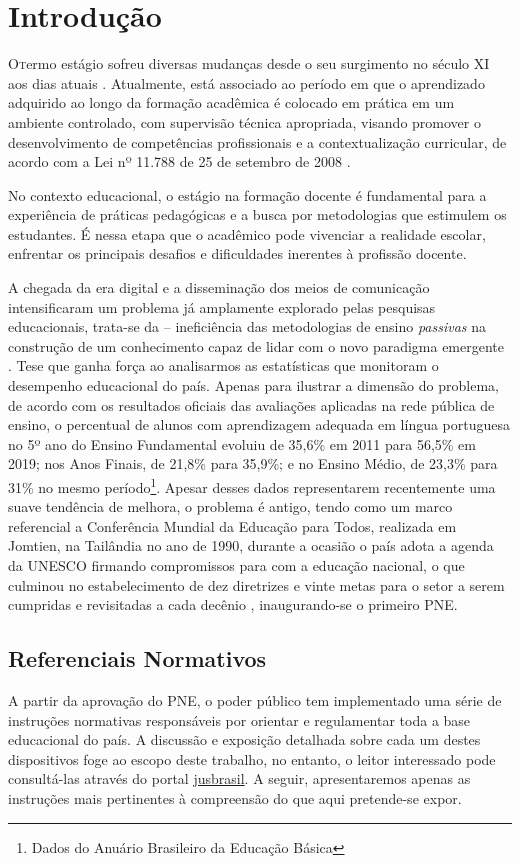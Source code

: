 \chapter{Introdução} %
\thispagestyle{empty}
\label{chap:Introdução}

\lettrine{O} termo estágio sofreu diversas mudanças desde o seu surgimento no século XI aos dias atuais \cite{COLOMBO:2014}. Atualmente, está associado ao período em que o aprendizado adquirido ao longo da formação acadêmica é colocado em prática em um ambiente controlado, com supervisão técnica apropriada, visando promover o desenvolvimento de competências profissionais e a contextualização curricular, de acordo com a Lei nº 11.788 de 25 de setembro de 2008 \cite{BRASIL:2008}.

No contexto educacional, o estágio na formação docente é fundamental para a experiência de práticas pedagógicas e a busca por metodologias que estimulem os estudantes. É nessa etapa que o acadêmico pode vivenciar a realidade escolar, enfrentar os principais desafios e dificuldades inerentes à profissão docente.

A chegada da era digital e a disseminação dos meios de comunicação intensificaram um problema já amplamente explorado pelas pesquisas educacionais, trata-se da -- ineficiência das metodologias de ensino \textit{passivas} na construção de um conhecimento capaz de lidar com o novo paradigma emergente \cite{MORAES:2018,DIESEL:2017}. Tese que ganha força ao analisarmos as estatísticas que monitoram o desempenho educacional do país. Apenas para ilustrar a dimensão do problema, de acordo com os resultados oficiais das avaliações aplicadas na rede pública de ensino, o percentual de alunos com aprendizagem adequada em língua portuguesa no 5º ano do Ensino Fundamental evoluiu de 35,6\% em 2011 para 56,5\% em 2019; nos Anos Finais, de 21,8\% para 35,9\%; e no Ensino Médio, de 23,3\% para 31\% no mesmo período\footnote{Dados do Anuário Brasileiro da Educação Básica}. Apesar desses dados representarem recentemente uma suave tendência de melhora, o problema é antigo, tendo como um marco referencial a Conferência Mundial da Educação para Todos, realizada em Jomtien, na Tailândia no ano de 1990, durante a ocasião o país adota a agenda da \ac{UNESCO} firmando compromissos para com a educação nacional, o que culminou no estabelecimento de dez diretrizes e vinte metas para o setor a serem cumpridas e revisitadas a cada decênio \cite{BRASIL:2001}, inaugurando-se o primeiro \ac{PNE}.

\section{Referenciais Normativos} %
\label{sec:Referenciais Normativos}
A partir da aprovação do \ac{PNE}, o poder público tem implementado uma série de instruções normativas responsáveis por orientar e regulamentar toda a base educacional do país. A discussão e exposição detalhada sobre cada um destes dispositivos foge ao escopo deste trabalho, no entanto, o leitor interessado pode consultá-las através do portal \href{https://www.jusbrasil.com.br/}{jusbrasil}. A seguir, apresentaremos apenas as instruções mais pertinentes à compreensão do que aqui pretende-se expor.

